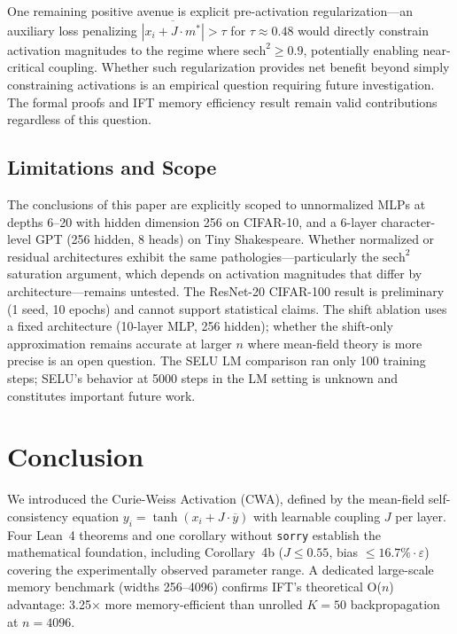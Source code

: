 \documentclass[11pt,twocolumn,letterpaper]{article}
\begin{document}
One remaining positive avenue is explicit pre-activation regularization---an auxiliary loss penalizing
$\overline{|x_i + J\cdot m^*|} > \tau$ for $\tau \approx 0.48$ would directly constrain activation magnitudes to the
regime where $\text{sech}^2 \geq 0.9$, potentially enabling near-critical coupling. Whether such regularization provides
net benefit beyond simply constraining activations is an empirical question requiring future investigation. The formal
proofs and IFT memory efficiency result remain valid contributions regardless of this question.

\subsection{Limitations and Scope}

The conclusions of this paper are explicitly scoped to unnormalized MLPs at depths 6--20 with hidden dimension 256 on
CIFAR-10, and a 6-layer character-level GPT (256 hidden, 8 heads) on Tiny Shakespeare. Whether normalized or residual
architectures exhibit the same pathologies---particularly the $\text{sech}^2$ saturation argument, which depends on
activation magnitudes that differ by architecture---remains untested. The ResNet-20 CIFAR-100 result is preliminary
(1 seed, 10 epochs) and cannot support statistical claims. The shift ablation uses a fixed architecture (10-layer MLP,
256 hidden); whether the shift-only approximation remains accurate at larger $n$ where mean-field theory is more precise
is an open question. The SELU LM comparison ran only 100 training steps; SELU's behavior at 5000 steps in the LM setting
is unknown and constitutes important future work.

\section{Conclusion}

We introduced the Curie-Weiss Activation (CWA), defined by the mean-field self-consistency equation
$y_i = \tanh(x_i + J\cdot\overline{y})$ with learnable coupling $J$ per layer. Four Lean~4 theorems and one corollary
without \texttt{sorry} establish the mathematical foundation, including Corollary~4b ($J \leq 0.55$, bias
$\leq 16.7\%\cdot\varepsilon$) covering the experimentally observed parameter range. A dedicated large-scale memory
benchmark (widths 256--4096) confirms IFT's theoretical O($n$) advantage: 3.25$\times$ more memory-efficient than
unrolled $K=50$ backpropagation at $n = 4096$.
\end{document}
